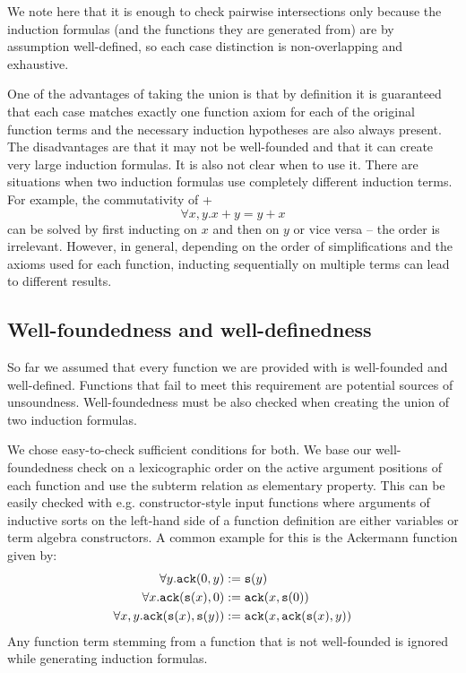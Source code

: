 We note here that it is enough to check pairwise intersections only because the induction formulas (and the functions they are generated from) are by assumption well-defined, so each case distinction is non-overlapping and exhaustive.

One of the advantages of taking the union is that by definition it is guaranteed that each case matches exactly one function axiom for each of the original function terms and the necessary induction hypotheses are also always present. The disadvantages are that it may not be well-founded and that it can create very large induction formulas. It is also not clear when to use it. There are situations when two induction formulas use completely different induction terms. For example, the commutativity of +
$$\forall x,y.x+y=y+x$$
can be solved by first inducting on $x$ and then on $y$ or vice versa -- the order is irrelevant. However, in general, depending on the order of simplifications and the axioms used for each function, inducting sequentially on multiple terms can lead to different results.


\subsection{Well-foundedness and well-definedness}
So far we assumed that every function we are provided with is well-founded and well-defined. Functions that fail to meet this requirement are potential sources of unsoundness. Well-foundedness must be also checked when creating the union of two induction formulas.

We chose easy-to-check sufficient conditions for both. We base our well-foundedness check on a lexicographic order on the active argument positions of each function and use the subterm relation as elementary property. This can be easily checked with e.g. constructor-style input functions where arguments of inductive sorts on the left-hand side of a function definition are either variables or term algebra constructors. A common example for this is the Ackermann function given by:
$$\begin{aligned}\forall y. \mathtt{ack}(0,y)&:=\mathtt{s}(y)\\
\forall x.\mathtt{ack}(\mathtt{s}(x),0)&:=\mathtt{ack}(x,\mathtt{s}(0))\\
\forall x,y.\mathtt{ack}(\mathtt{s}(x),\mathtt{s}(y))&:=\mathtt{ack}(x,\mathtt{ack}(\mathtt{s}(x),y))\end{aligned}$$
Any function term stemming from a function that is not well-founded is ignored while generating induction formulas.

